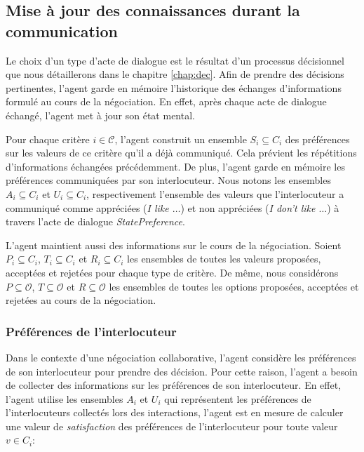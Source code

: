 			\subsection{Mise à jour des connaissances durant la communication}
			
			Le choix d'un type d'acte de dialogue est le résultat d'un processus décisionnel que nous détaillerons dans le chapitre \ref{chap:dec}. 
			Afin de prendre des décisions pertinentes, l'agent garde en mémoire l'historique des échanges d'informations formulé au cours de la négociation.  En effet, après chaque acte de dialogue échangé, l'agent met à jour son état mental.  
			
			
			Pour chaque critère $i\in\mathcal{C}$, l'agent construit un ensemble $S_i \subseteq C_i$ des préférences sur les valeurs de ce critère qu'il a déjà communiqué. Cela prévient les répétitions d'informations échangées précédemment. 
			De plus, l'agent garde en mémoire les préférences communiquées par son interlocuteur. Nous notons les ensembles $A_i\subseteq C_i$ et $U_i\subseteq C_i$, respectivement l'ensemble des valeurs que l'interlocuteur a communiqué comme appréciées (\textit{I like $\ldots$}) et non appréciées  (\textit{I don't like $\ldots$}) à travers l'acte de dialogue \textit{StatePreference}. 
			
			L'agent maintient aussi des informations sur le cours de la négociation. Soient $P_i \subseteq C_i$, $T_i\subseteq C_i$ et $R_i\subseteq C_i$ les ensembles de toutes les valeurs proposées, acceptées et rejetées pour chaque type de critère. 
			De même, nous considérons $P\subseteq \mathcal{O}$, $T\subseteq \mathcal{O}$ et $R\subseteq \mathcal{O}$ les ensembles de toutes les options proposées, acceptées et rejetées au cours de la négociation.
			
			\subsubsection{Préférences de  l'interlocuteur}
				Dans le contexte d'une négociation collaborative, l'agent considère les préférences de son interlocuteur pour prendre des décision. Pour cette raison, l'agent a besoin de collecter des informations sur les préférences de son interlocuteur. En effet, l'agent utilise les ensembles $A_i$ et $U_i$ qui représentent les préférences de l'interlocuteurs collectés lors des interactions, l'agent est en mesure de calculer une valeur de \emph{satisfaction} des préférences de l'interlocuteur pour toute valeur $v\in C_i$: 
				
